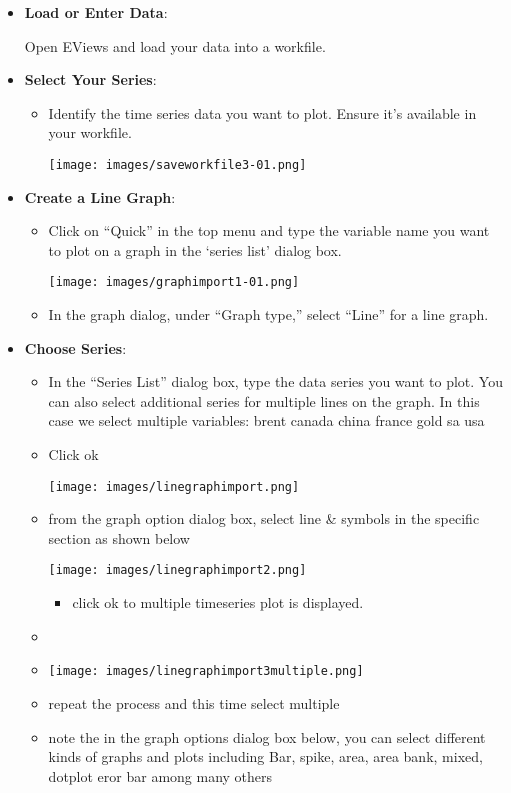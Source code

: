 \documentclass[
  letterpaper,
  DIV=11,
  numbers=noendperiod]{scrartcl}
\providecommand{\tightlist}{%
  \setlength{\itemsep}{0pt}\setlength{\parskip}{0pt}}\usepackage{longtable,booktabs,array}
\begin{document}
\begin{itemize}
\item
  \textbf{Load or Enter Data}:

  Open EViews and load your data into a workfile.
\item
  \textbf{Select Your Series}:

  \begin{itemize}
  \item
    Identify the time series data you want to plot. Ensure it's
    available in your workfile.

    \texttt{[image: images/saveworkfile3-01.png]}
  \end{itemize}
\item
  \textbf{Create a Line Graph}:

  \begin{itemize}
  \item
    Click on ``Quick'' in the top menu and type the variable name you
    want to plot on a graph in the `series list' dialog box.

    \texttt{[image: images/graphimport1-01.png]}
  \item
    In the graph dialog, under ``Graph type,'' select ``Line'' for a
    line graph.
  \end{itemize}
\item
  \textbf{Choose Series}:

  \begin{itemize}
  \item
    In the ``Series List'' dialog box, type the data series you want to
    plot. You can also select additional series for multiple lines on
    the graph. In this case we select multiple variables: brent canada
    china france gold sa usa
  \item
    Click ok

    \texttt{[image: images/linegraphimport.png]}
  \item
    from the graph option dialog box, select line \& symbols in the
    specific section as shown below

    \texttt{[image: images/linegraphimport2.png]}

    \begin{itemize}
    \tightlist
    \item
      click ok to multiple timeseries plot is displayed.
    \end{itemize}
  \item
  \item
    \texttt{[image: images/linegraphimport3multiple.png]}
  \item
    repeat the process and this time select multiple
  \item
    note the in the graph options dialog box below, you can select
    different kinds of graphs and plots including Bar, spike, area, area
    bank, mixed, dotplot eror bar among many others
  \end{itemize}
\end{itemize}
\end{document}

